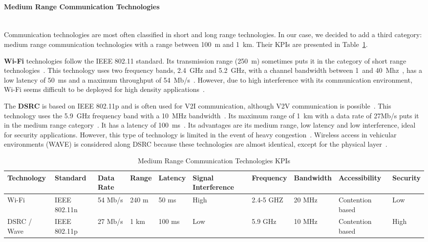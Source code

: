 \paragraph{Medium Range Communication Technologies}\ \\

Communication technologies are most often classified in short and long range technologies. In our case, we decided to add a third category: medium range communication technologies with a range between 100~m and 1~km. Their \acrshort{KPI}s are presented in Table~\ref{tab:medium-range-com}.%

\textbf{\acrfull{Wi-Fi}} technologies follow the IEEE 802.11 standard. Its transmission range (250~m) sometimes puts it in the category of short range technologies~\cite{araniti_lte_2013,anwer_survey_2014}. This technology uses two frequency bands, 2.4~GHz and 5.2~GHz, with a channel bandwidth between 1~and 40~Mhz~\cite{papadimitratos_vehicular_2009}, has a low latency of 50~ms and a maximum throughput of 54~Mb/s~\cite{ahangar_survey_2021}. However, due to high interference with its communication environment, Wi-Fi seems difficult to be deployed for high density applications~\cite{chen_lte-v_2016}.

The \textbf{\acrfull{DSRC}} is based on IEEE 802.11p and is often used for \acrshort{V2I} communication, although \acrshort{V2V} communication is possible~\cite{ahangar_survey_2021}. This technology uses the 5.9~GHz frequency band with a 10~MHz bandwidth~\cite{ghosal_security_2020}. 
Its maximum range of 1~km with a data rate of 27Mb/s puts it in the medium range category~\cite{anwer_survey_2014}. It has a latency of 100~ms~\cite{ahangar_survey_2021}. Its advantages are its medium range, low latency and low interference, ideal for security applications. However, this type of technology is limited in the event of heavy congestion~\cite{cailean_survey_2014}. Wireless access in vehicular environments (WAVE) is considered along \acrshort{DSRC} because these technologies are almost identical, except for the physical layer~\cite{ghosal_security_2020}.

\begin{table}[ht!]
  \centering
  \caption{Medium Range Communication Technologies \acrshort{KPI}s}
  \label{tab:medium-range-com}
  \begin{tabular}{p{} p{1cm} p{1cm} p{1cm} p{1cm} p{1.5cm} p{1.2cm} p{1.3cm} p{1.4cm} p{1.4cm}}
    \hline
    Technology & Standard & Data Rate & Range  & Latency & Signal Interference  & Frequency &  Bandwidth & Accessibility & Security\\
    \hline
    Wi-Fi &  IEEE 802.11n  &  54 Mb/s	&   240 m &  50 ms  & High & 2.4-5 GHZ	 & 20 MHz	 & Contention based&	Low\\
    
    DSRC / Wave  & IEEE 802.11p	& 27 Mb/s	& 1 km&	100 ms  & Low &  5.9 GHz	& 10 MHz& 	Contention based &	High\\
    \hline	
  \end{tabular}
\end{table}


